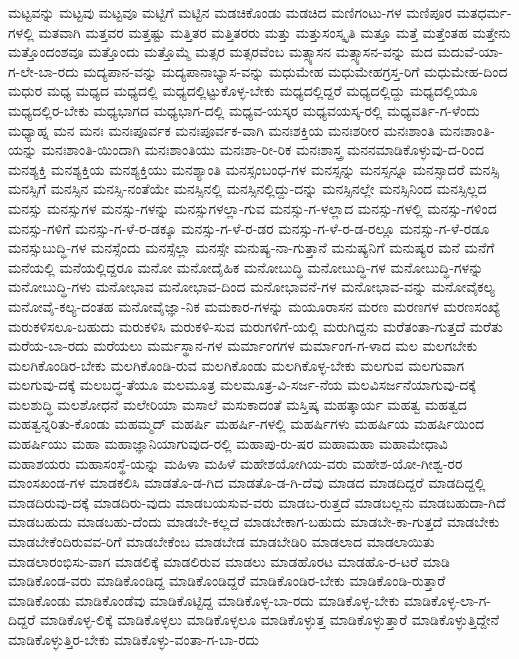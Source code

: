 {ಮಟ್ಟವನ್ನು
ಮಟ್ಟವು
ಮಟ್ಟವೂ
ಮಟ್ಟಿಗೆ
ಮಟ್ಟಿನ
ಮಡಚಿಕೊಂಡು
ಮಡಚಿದ
ಮಣಿಗಂಟು-ಗಳ
ಮಣಿಪೂರ
ಮತಧರ್ಮ-ಗಳಲ್ಲಿ
ಮತವಾಗಿ
ಮತ್ತವರ
ಮತ್ತಷ್ಟು
ಮತ್ತಿತರ
ಮತ್ತಿತರರು
ಮತ್ತು
ಮತ್ತುಸಂಸ್ಕೃತಿ
ಮತ್ತೂ
ಮತ್ತೆ
ಮತ್ತೆಂತಹ
ಮತ್ತೇನು
ಮತ್ತೊಂದಂಶವೂ
ಮತ್ತೊಂದು
ಮತ್ತೊಮ್ಮೆ
ಮತ್ಸರ
ಮತ್ಸರವೆಂಬ
ಮತ್ಸ್ಯಾಸನ
ಮತ್ಸ್ಯಾಸನ-ವನ್ನು
ಮದ
ಮದುವೆ-ಯಾ-ಗ-ಲೇ-ಬಾ-ರದು
ಮದ್ಯಪಾನ-ವನ್ನು
ಮದ್ಯಪಾನಾಭ್ಯಾಸ-ವನ್ನು
ಮಧುಮೇಹ
ಮಧುಮೇಹಗ್ರಸ್ತ-ರಿಗೆ
ಮಧುಮೇಹ-ದಿಂದ
ಮಧುರ
ಮಧ್ಯ
ಮಧ್ಯದ
ಮಧ್ಯದಲ್ಲಿ
ಮಧ್ಯದಲ್ಲಿಟ್ಟುಕೊಳ್ಳ-ಬೇಕು
ಮಧ್ಯದಲ್ಲಿದ್ದರೆ
ಮಧ್ಯದಲ್ಲಿದ್ದು
ಮಧ್ಯದಲ್ಲಿಯೂ
ಮಧ್ಯದಲ್ಲಿರ-ಬೇಕು
ಮಧ್ಯಭಾಗದ
ಮಧ್ಯಭಾಗ-ದಲ್ಲಿ
ಮಧ್ಯವ-ಯಸ್ಕರ
ಮಧ್ಯವಯಸ್ಕ-ರಲ್ಲಿ
ಮಧ್ಯವರ್ತಿ-ಗ-ಳೆಂದು
ಮಧ್ಯಾಹ್ನ
ಮನ
ಮನಃ
ಮನಃಪೂರ್ವಕ
ಮನಃಪೂರ್ವಕ-ವಾಗಿ
ಮನಃಶಕ್ತಿಯ
ಮನಃಶರೀರ
ಮನಃಶಾಂತಿ
ಮನಃಶಾಂತಿ-ಯನ್ನು
ಮನಃಶಾಂತಿ-ಯಿಂದಾಗಿ
ಮನಃಶಾಂತಿಯು
ಮನಃಶಾ-ರೀ-ರಿಕ
ಮನಃಶಾಸ್ತ್ರ
ಮನನಮಾಡಿಕೊಳ್ಳುವು-ದ-ರಿಂದ
ಮನಶ್ಯಕ್ತಿ
ಮನಶ್ಯಕ್ತಿಯ
ಮನಶ್ಯಕ್ತಿಯು
ಮನಶ್ಯಾಂತಿ
ಮನಸ್ಸಂಬಂಧ-ಗಳ
ಮನಸ್ಸನ್ನು
ಮನಸ್ಸನ್ನೂ
ಮನಸ್ಸಾದರೆ
ಮನಸ್ಸಿ
ಮನಸ್ಸಿಗೆ
ಮನಸ್ಸಿನ
ಮನಸ್ಸಿ-ನಂತೆಯೇ
ಮನಸ್ಸಿನಲ್ಲಿ
ಮನಸ್ಸಿನಲ್ಲಿದ್ದು-ದನ್ನು
ಮನಸ್ಸಿನಲ್ಲೇ
ಮನಸ್ಸಿನಿಂದ
ಮನಸ್ಸಿಲ್ಲದ
ಮನಸ್ಸು
ಮನಸ್ಸುಗಳ
ಮನಸ್ಸು-ಗಳನ್ನು
ಮನಸ್ಸುಗಳಲ್ಲಾ-ಗುವ
ಮನಸ್ಸು-ಗ-ಳಲ್ಲಾದ
ಮನಸ್ಸು-ಗಳಲ್ಲಿ
ಮನಸ್ಸು-ಗಳಿಂದ
ಮನಸ್ಸು-ಗಳಿಗೆ
ಮನಸ್ಸು-ಗ-ಳೆ-ರ-ಡಕ್ಕೂ
ಮನಸ್ಸು-ಗ-ಳೆ-ರ-ಡರ
ಮನಸ್ಸು-ಗ-ಳೆ-ರ-ಡ-ರಲ್ಲೂ
ಮನಸ್ಸು-ಗ-ಳೆ-ರಡೂ
ಮನಸ್ಸುಬುದ್ಧಿ-ಗಳ
ಮನಸ್ಸೆಂದು
ಮನಸ್ಸೆಲ್ಲಾ
ಮನಸ್ಸೇ
ಮನುಷ್ಯ-ನಾ-ಗುತ್ತಾನೆ
ಮನುಷ್ಯನಿಗೆ
ಮನುಷ್ಯರ
ಮನೆ
ಮನೆಗೆ
ಮನೆಯಲ್ಲಿ
ಮನೆಯಲ್ಲಿದ್ದರೂ
ಮನೋ
ಮನೋದೈಹಿಕ
ಮನೋಬುದ್ಧಿ
ಮನೋಬುದ್ಧಿ-ಗಳ
ಮನೋಬುದ್ಧಿ-ಗಳನ್ನು
ಮನೋಬುದ್ಧಿ-ಗಳು
ಮನೋಭಾವ
ಮನೋಭಾವ-ದಿಂದ
ಮನೋಭಾವನೆ-ಗಳ
ಮನೋಭಾವ-ವನ್ನು
ಮನೋವೈಕಲ್ಯ
ಮನೋವೈ-ಕಲ್ಯ-ದಂತಹ
ಮನೋವೈಜ್ಞಾ-ನಿಕ
ಮಮಕಾರ-ಗಳನ್ನು
ಮಯೂರಾಸನ
ಮರಣ
ಮರಣಗಳ
ಮರಣಸಂಖ್ಯೆ
ಮರುಕಳಿಸಲೂ-ಬಹುದು
ಮರುಕಳಿಸಿ
ಮರುಕಳಿ-ಸುವ
ಮರುಗಳಿಗೆ-ಯಲ್ಲಿ
ಮರುಗಿದ್ದನು
ಮರೆತಂತಾ-ಗುತ್ತದೆ
ಮರೆತು
ಮರೆಯ-ಬಾ-ರದು
ಮರೆಯಲು
ಮರ್ಮಸ್ಥಾನ-ಗಳ
ಮರ್ಮಾಂಗಗಳ
ಮರ್ಮಾಂಗ-ಗ-ಳಾದ
ಮಲ
ಮಲಗಬೇಕು
ಮಲಗಿಕೊಂಡಿರ-ಬೇಕು
ಮಲಗಿಕೊಂಡಿ-ರುವ
ಮಲಗಿಕೊಂಡು
ಮಲಗಿಕೊಳ್ಳ-ಬೇಕು
ಮಲಗುವ
ಮಲಗುವಾಗ
ಮಲಗುವು-ದಕ್ಕೆ
ಮಲಬದ್ಧ-ತೆಯೂ
ಮಲಮೂತ್ರ
ಮಲಮೂತ್ರ-ವಿ-ಸರ್ಜ-ನೆಯ
ಮಲವಿಸರ್ಜನೆಯಾಗುವು-ದಕ್ಕೆ
ಮಲಶುದ್ಧಿ
ಮಲಶೋಧನೆ
ಮಲೇರಿಯಾ
ಮಸಾಲೆ
ಮಸುಕಾದಂತೆ
ಮಸ್ತಿಷ್ಕ
ಮಹತ್ಕಾರ್ಯ
ಮಹತ್ವ
ಮಹತ್ವದ
ಮಹತ್ವನ್ನರಿತು-ಕೊಂಡು
ಮಹಮ್ಮದ್
ಮಹರ್ಷಿ
ಮಹರ್ಷಿ-ಗಳಲ್ಲಿ
ಮಹರ್ಷಿಗಳು
ಮಹರ್ಷಿಯ
ಮಹರ್ಷಿಯಿಂದ
ಮಹರ್ಷಿಯು
ಮಹಾ
ಮಹಾಜ್ಞಾನಿಯಾಗುವುದ-ರಲ್ಲಿ
ಮಹಾಪು-ರು-ಷರ
ಮಹಾಮಹಾ
ಮಹಾಮೇಧಾವಿ
ಮಹಾಶಯರು
ಮಹಾಸಂಸ್ಥೆ-ಯನ್ನು
ಮಹಿಳಾ
ಮಹಿಳೆ
ಮಹೇಶಯೋಗಿಯ-ವರು
ಮಹೇಶ-ಯೋ-ಗೀಶ್ವ-ರರ
ಮಾಂಸಖಂಡ-ಗಳ
ಮಾಡಕಲಿಸಿ
ಮಾಡತೊ-ಡ-ಗಿದ
ಮಾಡತೊ-ಡ-ಗಿ-ದೆವು
ಮಾಡದ
ಮಾಡದಿದ್ದರೆ
ಮಾಡದಿದ್ದಲ್ಲಿ
ಮಾಡದಿರುವು-ದಕ್ಕೆ
ಮಾಡದಿರು-ವುದು
ಮಾಡಬಯಸುವ-ವರು
ಮಾಡಬ-ರುತ್ತದೆ
ಮಾಡಬಲ್ಲನು
ಮಾಡಬಹುದಾ-ಗಿದೆ
ಮಾಡಬಹುದು
ಮಾಡಬಹು-ದೆಂದು
ಮಾಡಬೇ-ಕಲ್ಲದೆ
ಮಾಡಬೇಕಾಗ-ಬಹುದು
ಮಾಡಬೇ-ಕಾ-ಗುತ್ತದೆ
ಮಾಡಬೇಕು
ಮಾಡಬೇಕೆಂದಿರುವವ-ರಿಗೆ
ಮಾಡಬೇಕೆಂಬ
ಮಾಡಬೇಡ
ಮಾಡಬೇಡಿರಿ
ಮಾಡಲಾದ
ಮಾಡಲಾಯಿತು
ಮಾಡಲಾರಂಭಿಸು-ವಾಗ
ಮಾಡಲಿಕ್ಕೆ
ಮಾಡಲಿರುವ
ಮಾಡಲು
ಮಾಡಹೊರಟ
ಮಾಡಹೊ-ರ-ಟರೆ
ಮಾಡಿ
ಮಾಡಿಕೊಂಡ-ವರು
ಮಾಡಿಕೊಂಡಿದ್ದ
ಮಾಡಿಕೊಂಡಿದ್ದರೆ
ಮಾಡಿಕೊಂಡಿರ-ಬೇಕು
ಮಾಡಿಕೊಂಡಿ-ರುತ್ತಾರೆ
ಮಾಡಿಕೊಂಡು
ಮಾಡಿಕೊಂಡೆವು
ಮಾಡಿಕೊಟ್ಟಿದ್ದ
ಮಾಡಿಕೊಳ್ಳ-ಬಾ-ರದು
ಮಾಡಿಕೊಳ್ಳ-ಬೇಕು
ಮಾಡಿಕೊಳ್ಳ-ಲಾ-ಗ-ದಿದ್ದರೆ
ಮಾಡಿಕೊಳ್ಳ-ಲಿಕ್ಕೆ
ಮಾಡಿಕೊಳ್ಳಲು
ಮಾಡಿಕೊಳ್ಳಲೂ
ಮಾಡಿಕೊಳ್ಳುತ್ತ
ಮಾಡಿಕೊಳ್ಳುತ್ತಾರೆ
ಮಾಡಿಕೊಳ್ಳುತ್ತಿದ್ದೇನೆ
ಮಾಡಿಕೊಳ್ಳುತ್ತಿರ-ಬೇಕು
ಮಾಡಿಕೊಳ್ಳು-ವಂತಾ-ಗ-ಬಾ-ರದು
}
